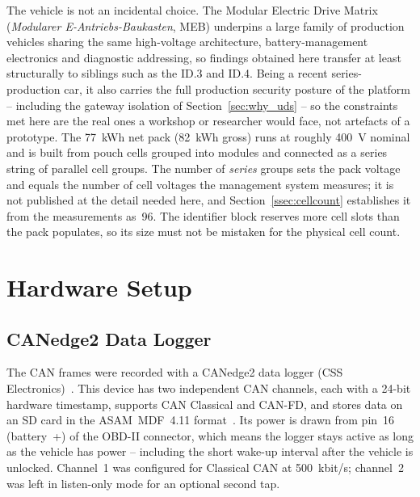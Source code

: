 \documentclass[11pt,a4paper,oneside,parskip=half]{scrreprt}
\begin{document}
The vehicle is not an incidental choice. The Modular Electric Drive Matrix (\textit{Modularer E-Antriebs-Baukasten}, MEB) underpins a large family of production vehicles sharing the same high-voltage architecture, battery-management electronics and diagnostic addressing, so findings obtained here transfer at least structurally to siblings such as the ID.3 and ID.4. Being a recent series-production car, it also carries the full production security posture of the platform -- including the gateway isolation of Section~\ref{sec:why_uds} -- so the constraints met here are the real ones a workshop or researcher would face, not artefacts of a prototype. The 77~kWh net pack (82~kWh gross) runs at roughly 400~V nominal and is built from pouch cells grouped into modules and connected as a series string of parallel cell groups. The number of \emph{series} groups sets the pack voltage and equals the number of cell voltages the management system measures; it is not published at the detail needed here, and Section~\ref{ssec:cellcount} establishes it from the measurements as~96. The identifier block reserves more cell slots than the pack populates, so its size must not be mistaken for the physical cell count.

\section{Hardware Setup}
\subsection{CANedge2 Data Logger}
The CAN frames were recorded with a CANedge2 data logger (CSS Electronics)~\cite{csselectronics_canedge2}. This device has two independent CAN channels, each with a 24-bit hardware timestamp, supports CAN Classical and CAN-FD, and stores data on an SD card in the ASAM~MDF~4.11 format~\cite{asammdf}. Its power is drawn from pin~16 (battery~+) of the OBD-II connector, which means the logger stays active as long as the vehicle has power -- including the short wake-up interval after the vehicle is unlocked. Channel~1 was configured for Classical CAN at 500~kbit/s; channel~2 was left in listen-only mode for an optional second tap.
\end{document}
